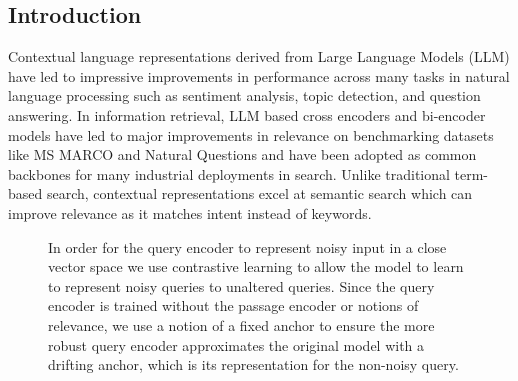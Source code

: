 \subsection{Introduction}
Contextual language representations derived from Large Language Models (LLM) have led to impressive improvements in performance across many tasks in natural language processing such as sentiment analysis, topic detection, and question answering. In information retrieval, LLM based cross encoders and bi-encoder models have led to major improvements in relevance on benchmarking datasets like MS MARCO \cite{Campos2016MSMA} and Natural Questions \cite{Kwiatkowski2019NaturalQA} and have been adopted as common backbones for many industrial deployments in search. Unlike traditional term-based search, contextual representations excel at semantic search which can improve relevance as it matches intent instead of keywords. \\
\begin{figure}[!htb]
  \caption{In order for the query encoder to represent noisy input in a close vector space we use contrastive learning to allow the model to learn to represent noisy queries to unaltered queries. Since the query encoder is trained without the passage encoder or notions of relevance, we use a notion of a fixed anchor to ensure the more robust query encoder approximates the original model with a drifting anchor, which is its representation for the non-noisy query.}
  \label{fig:capot-fig1}
\end{figure}
